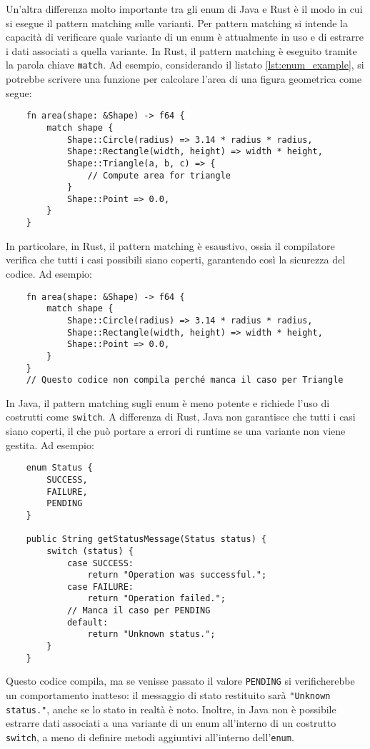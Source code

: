 Un'altra differenza molto importante tra gli enum di Java e Rust è il modo in cui si esegue il pattern matching sulle varianti. Per pattern matching si intende la capacità di verificare quale variante di un enum è attualmente in uso e di estrarre i dati associati a quella variante. In Rust, il pattern matching è eseguito tramite la parola chiave \texttt{match}. Ad esempio, considerando il listato \ref{lst:enum_example}, si potrebbe scrivere una funzione per calcolare l'area di una figura geometrica come segue:
\begin{verbatim}
    fn area(shape: &Shape) -> f64 {
        match shape {
            Shape::Circle(radius) => 3.14 * radius * radius,
            Shape::Rectangle(width, height) => width * height,
            Shape::Triangle(a, b, c) => {
                // Compute area for triangle
            }
            Shape::Point => 0.0,
        }
    }
\end{verbatim}
In particolare, in Rust, il pattern matching è esaustivo, ossia il compilatore verifica che tutti i casi possibili siano coperti, garantendo così la sicurezza del codice. Ad esempio:
\begin{verbatim}
    fn area(shape: &Shape) -> f64 {
        match shape {
            Shape::Circle(radius) => 3.14 * radius * radius,
            Shape::Rectangle(width, height) => width * height,
            Shape::Point => 0.0,
        }
    }
    // Questo codice non compila perché manca il caso per Triangle
\end{verbatim}
In Java, il pattern matching sugli enum è meno potente e richiede l'uso di costrutti come \texttt{switch}. A differenza di Rust, Java non garantisce che tutti i casi siano coperti, il che può portare a errori di runtime se una variante non viene gestita. Ad esempio:
\begin{verbatim}
    enum Status {
        SUCCESS,
        FAILURE,
        PENDING
    }

    public String getStatusMessage(Status status) {
        switch (status) {
            case SUCCESS:
                return "Operation was successful.";
            case FAILURE:
                return "Operation failed.";
            // Manca il caso per PENDING
            default:
                return "Unknown status.";
        }
    }
\end{verbatim}
Questo codice compila, ma se venisse passato il valore \texttt{PENDING} si verificherebbe un comportamento inatteso: il messaggio di stato restituito sarà \texttt{"Unknown status."}, anche se lo stato in realtà è noto. Inoltre, in Java non è possibile estrarre dati associati a una variante di un enum all'interno di un costrutto \texttt{switch}, a meno di definire metodi aggiuntivi all'interno dell'\texttt{enum}. 

